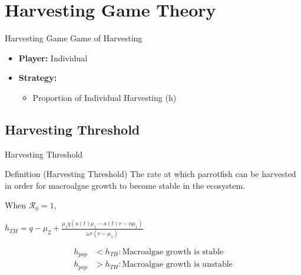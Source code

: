 \documentclass{beamer}
\begin{document}
\section{Harvesting Game Theory}

\begin{frame}{Harvesting Game}
Game of Harvesting 
\begin{itemize}
    \item \textbf{Player:} Individual
    \item \textbf{Strategy: } 
        \begin{itemize}
            \item Proportion of Individual Harvesting (h)
        \end{itemize}
\end{itemize}
\end{frame}

\subsection{Harvesting Threshold}
\begin{frame}{Harvesting Threshold}
    \begin{block}{Definition (Harvesting Threshold)}
        The rate at which parrotfish can be harvested in order for macroalgae growth to become stable in the ecosystem. 
    \end{block}
    
    \vspace{0.5cm}
    
    When $\mathscr{R}_{0} = 1$,
    \begin{center}
    
    $\displaystyle{h_{TH} = q - \mu_{2} + \frac{\mu_{1}q(a(t) \mu_{1} - a(t)r - \phi \mu_{1})}{\omega r(r-\mu_{1})}}$ \\
    \end{center}
    \begin{align*}
    h_{pop} &< h_{TH}: \text{Macroalgae growth is stable} \\
    h_{pop} &> h_{TH}: \text{Macroalgae growth is unstable}
    \end{align*}
\end{frame}
\end{document}
